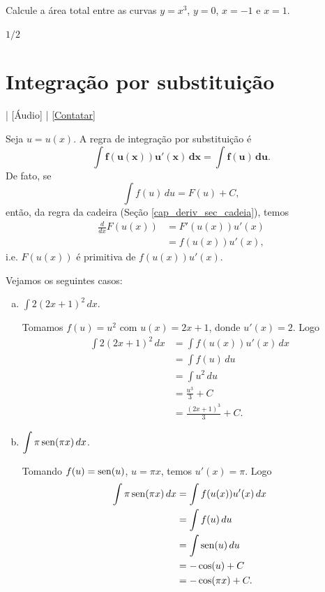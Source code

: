 \begin{exer}
  Calcule a área total entre as curvas $y=x^3$, $y=0$, $x=-1$ e $x=1$.
\end{exer}
\begin{resp}
  $1/2$
\end{resp}


\section{Integração por substituição}\label{cap_int_sec_subs}

\begin{flushright}
  [Vídeo] | [Áudio] | \href{https://phkonzen.github.io/notas/contato.html}{[Contatar]}
\end{flushright}

Seja $u = u(x)$. A regra de integração por substituição é
\begin{equation}
  \pmb{\int f(u(x))u'(x)\,dx = \int f(u)\,du}.
\end{equation}
De fato, se
\begin{equation}
  \int f(u)\,du = F(u) + C,
\end{equation}
então, da regra da cadeira (Seção \ref{cap_deriv_sec_cadeia}), temos
\begin{align}
  \frac{d}{dx}F(u(x)) &= F'(u(x))u'(x) \\
                      &= f(u(x))u'(x),
\end{align}
i.e. $F(u(x))$ é primitiva de $f(u(x))u'(x)$.

\begin{ex}
  Vejamos os seguintes casos:
  \begin{enumerate}[a)]
  \item $\displaystyle\int 2(2x+1)^2\,dx$.
    
    Tomamos $f(u) = u^2$ com $u(x) = 2x+1$, donde $u'(x) = 2$. Logo
    \begin{align}
      \int 2(2x+1)^2\,dx &= \int f(u(x))u'(x)\,dx \\
                         &= \int f(u)\,du \\
                         &= \int u^2\,du \\
                         &= \frac{u^3}{3} + C \\
                         &= \frac{(2x+1)^3}{3} + C.
    \end{align}
  \item $\displaystyle\int \pi\operatorname{sen}(\pi x)\,dx$.
    
    Tomando $f(u)=\operatorname{sen}(u)$, $u=\pi x$, temos $u'(x)=\pi$. Logo
    \begin{align}
      \int \pi\operatorname{sen}(\pi x)\,dx &= \int f(u(x))u'(x)\,dx \\
                              &= \int f(u)\,du \\
                              &= \int \operatorname{sen}(u)\,du \\
                              &= -\cos(u) + C \\
                              &= -\cos(\pi x) + C.
    \end{align}
  \end{enumerate}
\end{ex}

